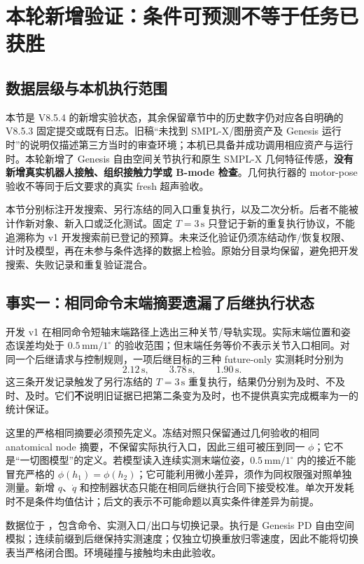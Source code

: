 \documentclass[11pt,a4paper,fontset=fandol]{ctexart}
\theoremstyle{definition}
\theoremstyle{remark}\newtheorem{remark}[theorem]{说明}
\numberwithin{equation}{section}
\begin{document}
\clearpage
\tableofcontents
\clearpage


\section{本轮新增验证：条件可预测不等于任务已获胜}
\label{sec:v854_development}
\subsection{数据层级与本机执行范围}
本节是 V8.5.4 的新增实验状态，其余保留章节中的历史数字仍对应各自明确的 V8.5.3 固定提交或既有日志。旧稿“未找到 SMPL-X/图册资产及 Genesis 运行时”的说明仅描述第三方当时的审查环境；本机已具备并成功调用相应资产与运行时。本轮新增了 Genesis 自由空间关节执行和原生 SMPL-X 几何特征传感，\textbf{没有新增真实机器人接触、组织接触力学或 B-mode 检查}。几何执行器的 motor-pose 验收不等同于后文要求的真实 fresh 超声验收。

本节分别标注开发搜索、另行冻结的同入口重复执行，以及二次分析。后者不能被计作新对象、新入口或泛化测试。固定 $T=3\,\mathrm{s}$ 只登记于新的重复执行协议，不能追溯称为 v1 开发搜索前已登记的预算。未来泛化验证仍须冻结动作/恢复权限、计时及模型，再在未参与条件选择的数据上检验。原始分目录均保留，避免把开发搜索、失败记录和重复验证混合。

\subsection{事实一：相同命令末端摘要遗漏了后继执行状态}
开发 v1 在相同命令短轴末端路径上选出三种关节/导轨实现。实际末端位置和姿态误差均处于 $0.5\,\mathrm{mm}/1^\circ$ 的验收范围；但末端任务等价不表示关节入口相同。对同一个后继请求与控制规则，一项后继目标的三种 future-only 实测耗时分别为
\[
 2.12\,\mathrm{s},\qquad3.78\,\mathrm{s},\qquad1.90\,\mathrm{s}.
\]
这三条开发记录触发了另行冻结的 $T=3\,\mathrm{s}$ 重复执行，结果仍分别为及时、不及时、及时。它们\textbf{不}说明旧证据已把第二条变为及时，也不提供真实完成概率为一的统计保证。

这里的严格相同摘要必须预先定义。冻结对照只保留通过几何验收的相同 anatomical node 摘要，不保留实际执行入口，因此三组可被压到同一 $\phi$；它不是“一切图模型”的定义。若模型读入连续实测末端位姿，$0.5\,\mathrm{mm}/1^\circ$ 内的接近不能冒充严格的 $\phi(h_1)=\phi(h_2)$；它可能利用微小差异，须作为同权限强对照单独测量。新增 $q$、$\dot q$ 和控制器状态只能在相同后继执行合同下接受校准。单次开发耗时不是条件均值估计；后文的表示不可能命题以真实条件律差异为前提。

数据位于 ，包含命令、实测入口/出口与切换记录。执行是 Genesis PD 自由空间模拟；连续前缀到后继保持实测速度；仅独立切换重放归零速度，因此不能将切换表当严格闭合图。环境碰撞与接触均未由此验收。
\end{document}
